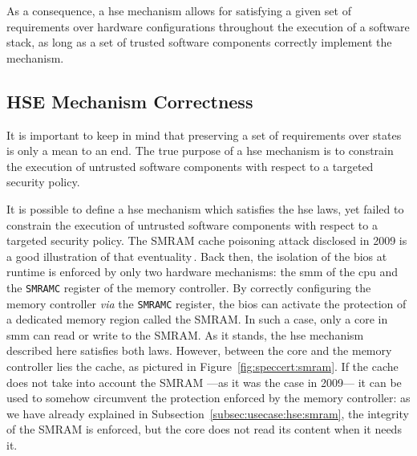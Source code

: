 As a consequence, a \ac{hse} mechanism allows for satisfying a given set of
requirements over hardware configurations throughout the execution of a software
stack, as long as a set of trusted software components correctly implement the
mechanism.

\subsection{HSE Mechanism Correctness}
\label{subsec:speccert:security}

It is important to keep in mind that preserving a set of requirements over
states is only a mean to an end.
%
The true purpose of a \ac{hse} mechanism is to constrain the execution of
untrusted software components with respect to a targeted security policy.

It is possible to define a \ac{hse} mechanism which satisfies the \ac{hse} laws,
yet failed to constrain the execution of untrusted software components with
respect to a targeted security policy.
%
The SMRAM cache poisoning attack disclosed in 2009 is a good illustration of
that eventuality\,\cite{duflot2009smram,wojtczuk2009smram}.
%
Back then, the isolation of the \ac{bios} at runtime is enforced by only two
hardware mechanisms: the \ac{smm} of the \ac{cpu} and the \texttt{SMRAMC}
register of the memory controller.
%
By correctly configuring the memory controller \emph{via} the \texttt{SMRAMC}
register, the \ac{bios} can activate the protection of a dedicated memory region
called the SMRAM.
%
In such a case, only a core in \ac{smm} can read or write to the SMRAM.
%
As it stands, the \ac{hse} mechanism described here satisfies both laws.
%
However, between the core and the memory controller lies the cache, as pictured
in Figure~\ref{fig:speccert:smram}.
%
If the cache does not take into account the SMRAM ---as it was the case in
2009--- it can be used to somehow circumvent the protection enforced by the
memory controller: as we have already explained in
Subsection~\ref{subsec:usecase:hse:smram}, the integrity of the SMRAM is
enforced, but the core does not read its content when it needs it.

